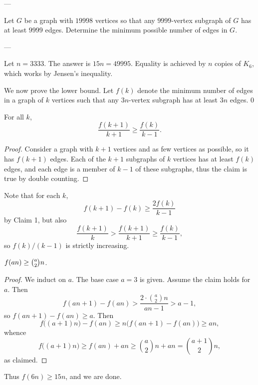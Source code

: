 
---

Let $G$ be a graph with $19998$ vertices so that any $9999$-vertex subgraph of $G$ has at least $9999$ edges. Determine the minimum possible number of edges in $G$.   

---

Let $n=3333$. The answer is $15n=49995$. Equality is achieved by $n$ copies of $K_6$, which works by Jensen's inequality.

We now prove the lower bound. Let $f(k)$ denote the minimum number of edges in a graph of $k$ vertices such that any $3n$-vertex subgraph has at least $3n$ edges.
\setcounter{iclaim}0
\begin{iclaim}
    For all $k$, \[\frac{f(k+1)}{k+1}\ge\frac{f(k)}{k-1}.\]
\end{iclaim}
\begin{proof}
    Consider a graph with $k+1$ vertices and as few vertices as possible, so it has $f(k+1)$ edges. Each of the $k+1$ subgraphs of $k$ vertices has at least $f(k)$ edges, and each edge is a member of $k-1$ of these subgraphs, thus the claim is true by double counting.
\end{proof}

Note that for each $k$, \[f(k+1)-f(k)\ge\frac{2f(k)}{k-1}\]
by Claim 1, but also \[\frac{f(k+1)}k>\frac{f(k+1)}{k+1}\ge\frac{f(k)}{k-1},\]
so $f(k)/(k-1)$ is strictly increasing.
\begin{iclaim}
    $f(an)\ge\tbinom a2n$.
\end{iclaim}
\begin{proof}
    We induct on $a$. The base case $a=3$ is given. Assume the claim holds for $a$. Then \[f(an+1)-f(an)>\frac{2\cdot\binom a2n}{an-1}>a-1,\]
    so $f(an+1)-f(an)\ge a$. Then \[f\big( (a+1)n\big)-f(an)\ge n\big(f(an+1)-f(an)\big)\ge an,\]
    whence \[f\big( (a+1)n\big)\ge f(an)+an\ge\binom a2n+an=\binom{a+1}2n,\]
    as claimed.
\end{proof}

Thus $f(6n)\ge15n$, and we are done.

